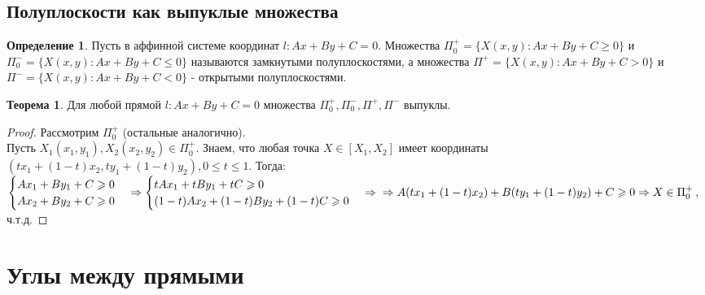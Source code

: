 \documentclass[a4paper, 12pt]{article}
\theoremstyle{definition}
\newtheorem*{definition}{Определение}
\newtheorem*{theorem}{Теорема}
\begin{document}
	\subsection{Полуплоскости как выпуклые множества}
	\begin{definition}
		Пусть в аффинной системе координат $l: Ax + By + C = 0$. Множества $\Pi_{0}^{+} = \{X(x, y): Ax + By + C \geqslant 0\}$ и $\Pi_{0}^{-} = \{X(x, y): Ax + By + C \leqslant 0\}$ называются замкнутыми полуплоскостями, а множества $\Pi^{+} = \{X(x, y): Ax + By + C > 0\}$ и $\Pi^{-} = \{X(x, y): Ax + By + C < 0\}$ - открытыми полуплоскостями.
	\end{definition}
	\begin{theorem}
		Для любой прямой $l: Ax + By + C = 0$ множества $\Pi_{0}^{+}, \Pi_{0}^{-}, \Pi^{+}, \Pi^{-}$ выпуклы.
	\end{theorem}
	\begin{proof}
		Рассмотрим $\Pi_{0}^{+}$ (остальные аналогично).\\
		Пусть $X_{1}(x_{1}, y_{1}), X_{2}(x_{2}, y_{2}) \in \Pi_{0}^{+}$. Знаем, что любая точка $X \in [X_{1}, X_{2}]$ имеет координаты $(tx_{1}+(1-t)x_{2}, ty_{1}+(1-t)y_{2}), 0 \leqslant t \leqslant 1$. Тогда:\\
		$\begin{cases}Ax_{1} + By_{1} + C \geqslant 0 \\ Ax_{2} + By_{2} + C \geqslant 0\end{cases} \Rightarrow \begin{cases}tAx_{1} + tBy_{1} + tC \geqslant 0 \\ (1-t)Ax_{2} + (1-t)By_{2} + (1-t)C \geqslant 0\end{cases} \Rightarrow \\ \Rightarrow A(tx_{1}+(1-t)x_{2}) + B(ty_{1}+(1-t)y_{2}) + C \geqslant 0 \Rightarrow X \in \Pi_{0}^{+}$, ч.т.д.
	\end{proof}
	\section{Углы между прямыми}
\end{document}

